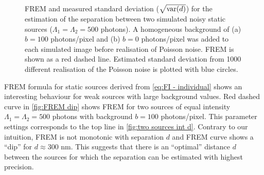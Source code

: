 \begin{figure}[!bh]
	\centering
	\newcommand{\wf}{.48\textwidth}
	\caption{FREM and measured standard deviation ($\sqrt{\mathrm{var}(d)}$) for the estimation of the separation between two simulated noisy static sources ($\Lambda_1=\Lambda_2=500$ photons). A homogeneous background of (a) $b=100$ photons/pixel and (b) $b=0$ photons/pixel was added to each simulated image before realisation of Poisson noise. FREM is shown as a red dashed line. Estimated standard deviation from 1000 different realisation of the Poisson noise is plotted with blue circles.}
\end{figure}

FREM formula for static sources derived from \autoref{eq:FI - individual} shows an interesting behaviour for weak sources with large background values. Red dashed curve in \autoref{fig:FREM dip} shows FREM for two sources of equal intensity $\Lambda_1=\Lambda_2=500$ photons with background $b=100$ photons/pixel. This parameter settings corresponds to the top line in \autoref{fig:two sources int d}. Contrary to our intuition, FREM is not monotonic with separation $d$ and FREM curve shows a ``dip'' for $d\approx300$ nm. This suggests that there is an ``optimal'' distance $d$ between the sources for which the separation can be estimated with highest precision.

